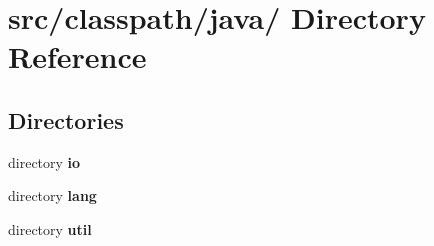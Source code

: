 \section{src/classpath/java/ Directory Reference}
\label{dir_7c926d120be78fbaec9d33ab5f68845e}
\subsection*{Directories}
\begin{DoxyCompactItemize}
\item 
directory {\bf io}
\item 
directory {\bf lang}
\item 
directory {\bf util}
\end{DoxyCompactItemize}
